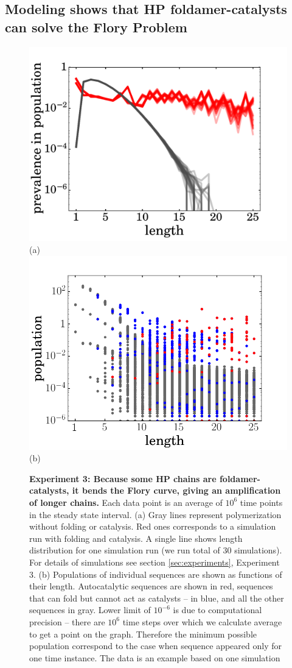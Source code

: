 \documentclass[5p,times]{elsarticle}
\begin{document}
\subsection{Modeling shows that HP foldamer-catalysts can solve the Flory Problem}
\begin{figure}[htb!]
  \centering
  \includegraphics[width=0.9\columnwidth]{pictures/distrHP-plain-many.pdf}(a) 
  \includegraphics[width=0.9\columnwidth]{pictures/scatter1837.png}(b) 
  \caption{\footnotesize{\textbf{Experiment 3: Because some HP chains are foldamer-catalysts, it 
bends the Flory curve, giving an amplification of longer chains.}  Each data point is an average 
of 
$10^6$ time points in the steady state interval. (a) Gray lines represent polymerization without 
folding or catalysis. Red ones corresponds to a simulation run with folding and catalysis. A 
single 
line shows length distribution for one simulation run (we run total of 30 simulations). For 
details 
of simulations see section \ref{sec:experiments}, Experiment 3. (b) Populations of individual 
sequences are 
shown as 
functions of their length. Autocatalytic sequences are shown in red, sequences that can fold but 
cannot act as  catalysts -- in blue, and all the other sequences in gray. Lower limit of $10^{-6}$ 
is due to computational precision -- there are $10^6$ time steps over which we calculate average 
to 
get a point on the graph. Therefore the minimum possible population correspond to the case when 
sequence appeared only for one time instance. The data is an example based on one simulation}}
  \label{fig:stats-scatter-018}
\end{figure}
\end{document}

